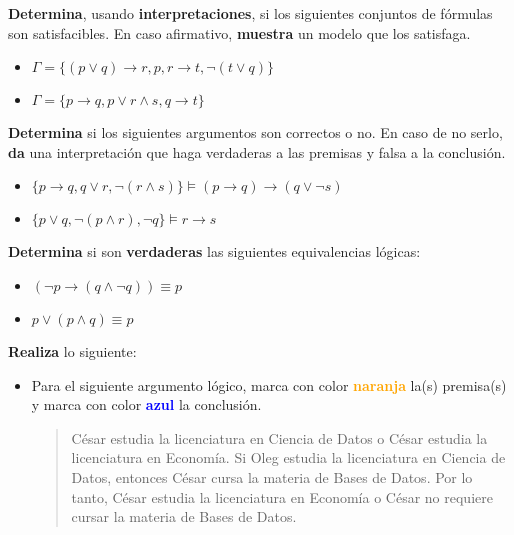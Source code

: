 \documentclass[oneside]{style}
\begin{document}
\begin{questions}[label=\protect\circled{\bfseries\arabic*}]
    \question
    {
        \textbf{Determina}, usando \textbf{interpretaciones}, si los siguientes 
        conjuntos de fórmulas son satisfacibles. En caso afirmativo, 
        \textbf{muestra} un modelo que los satisfaga.
        \begin{itemize}
            \item $\Gamma = \{(p \lor q) \rightarrow r, p, r \rightarrow t, 
            \neg (t \lor q)\}$
            \item $\Gamma = \{p \rightarrow q, p \lor r \land s, q \rightarrow 
            t\}$
        \end{itemize}
    }

    \question
    {
        \textbf{Determina} si los siguientes argumentos son correctos o no. En 
        caso de no serlo, \textbf{da} una interpretación que haga verdaderas a 
        las premisas y falsa a la conclusión. 
        \begin{itemize}
            \item $\{p \rightarrow q, q \lor r, \neg (r \land s)\} \models 
            (p \rightarrow q) \rightarrow (q \lor \neg s)$

            \item $\{p \lor q, \neg (p \land r), \neg q\} \models r \rightarrow
            s$
        \end{itemize}
    }

    \question
    {
        \textbf{Determina} si son \textbf{verdaderas} las siguientes 
        equivalencias lógicas:
        \begin{itemize}
            \item $(\neg p \rightarrow (q \land \neg q)) \equiv p$

            \item $p \lor (p \land q) \equiv p$
        \end{itemize}
    }

    \newpage
    \question
    {
        \textbf{Realiza} lo siguiente:
        \begin{itemize}
            \item Para el siguiente argumento lógico, marca con color 
            \textcolor{orange}{\textbf{naranja}} la(s) premisa(s) y marca con 
            color \textcolor{blue}{\textbf{azul}} la conclusión.

            \begin{quote}
                \centering
                César estudia la licenciatura en Ciencia de Datos o César 
                estudia la licenciatura en Economía. Si Oleg estudia la 
                licenciatura en Ciencia de Datos, entonces César cursa la 
                materia de Bases de Datos. Por lo tanto, César estudia la 
                licenciatura en Economía o César no requiere cursar la materia 
                de Bases de Datos.
            \end{quote}
    

\end{itemize}}
\end{questions}
\end{document}
